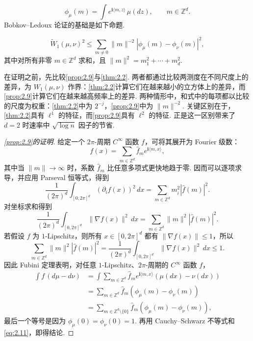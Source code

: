 \begin{equation}\label{eq:2.9}
\phi_\mu(m)=\int e^{\mathbf i\langle m,z\rangle}\,\mu(dz),\qquad m\in\mathbb Z^d.
\end{equation}
Bobkov--Ledoux 论证的基础是如下命题.
\begin{proposition}\label{prop:2.9}
\begin{equation}\label{eq:2.10}
\widetilde W_1(\mu,\nu)^2\le\sum_{m\ne0}\lVert m\rVert^{-2}|\phi_\mu(m)-\phi_\nu(m)|^2,
\end{equation}
其中对所有非零 $m\in\mathbb Z^d$ 求和，且 $\lVert m\rVert^2=m_1^2+\cdots+m_d^2$.
\end{proposition}
在证明之前，先比较\autoref{prop:2.9}与\autoref{thm:2.2}. 两者都通过比较两测度在不同尺度上的差异，为 $W_1(\mu,\nu)$ 作界：\autoref{thm:2.2}计算它们在越来越小的立方体上的差异，而\autoref{prop:2.9}计算它们在越来越高频率上的差异. 两种情形中，和式中的每项都以比较的尺度为权重：\autoref{thm:2.2}中为 $2^{-j}$，\autoref{prop:2.9}中为 $\lVert m\rVert^{-2}$. 关键区别在于，\autoref{thm:2.2}具有 $\ell^1$ 的特征，而\autoref{prop:2.9}具有 $\ell^2$ 的特征. 正是这一区别带来了 $d=2$ 时速率中 $\sqrt{\log n}$ 因子的节省.
\begin{proof}[\autoref{prop:2.9}的证明]
给定一个 $2\pi$-周期 $C^\infty$ 函数 $f$，可将其展开为 Fourier 级数：
$$f(x)=\sum_{m\in\mathbb Z^d}\hat f_m e^{\mathbf i\langle m,x\rangle},$$
其中当 $\lVert m\rVert\to\infty$ 时，系数 $\hat f_m$ 比任意多项式更快地趋于零. 因而可以逐项求导，并应用 Parseval 恒等式，得到
$$\frac1{(2\pi)^d}\int_{[0,2\pi]^d}(\partial_i f(x))^2\,dx
=\sum_{m\in\mathbb Z^d}m_i^2|\hat f(m)|^2.$$
对坐标求和得到
$$\frac1{(2\pi)^d}\int_{[0,2\pi]^d}\lVert\nabla f(x)\rVert^2\,dx
=\sum_{m\in\mathbb Z^d}\lVert m\rVert^2|\hat f(m)|^2.$$
若假设 $f$ 为 $1$-Lipschitz，则所有 $x\in[0,2\pi]^d$ 都有 $\lVert\nabla f(x)\rVert\le1$，所以
\begin{equation}\label{eq:2.11}
\sum_{m\in\mathbb Z^d}\lVert m\rVert^2|\hat f(m)|^2
=\frac1{(2\pi)^d}\int_{[0,2\pi]^d}\lVert\nabla f(x)\rVert^2\,dx\le1.
\end{equation}
因此 Fubini 定理表明，对任意 $1$-Lipschitz、$2\pi$-周期的 $C^\infty$ 函数 $f$，
$$\begin{aligned}
\int f\,(d\mu-d\nu)
&=\int\sum_{m\in\mathbb Z^d}\hat f_m e^{\mathbf i\langle m,x\rangle}(\mu(dx)-\nu(dx))\\
&=\sum_{m\in\mathbb Z^d}\hat f_m(\phi_\mu(m)-\phi_\nu(m))\\
&=\sum_{m\in\mathbb Z^d\setminus\{0\}}\hat f_m(\phi_\mu(m)-\phi_\nu(m)),
\end{aligned}$$
最后一个等号是因为 $\phi_\mu(0)=\phi_\nu(0)=1$. 再用 Cauchy--Schwarz 不等式和 \eqref{eq:2.11}，即得结论.
\end{proof}
